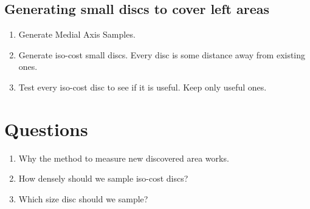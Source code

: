 \documentclass[12pt]{article}
\begin{document}
	
	\subsection{Generating small discs to cover left areas}
	
	\begin{enumerate}
	\item Generate Medial Axis Samples.
	\item Generate iso-cost small discs. Every disc is some distance away from existing ones.
	\item Test every iso-cost disc to see if it is useful. Keep only useful ones.
	\end{enumerate}
	
	\section{Questions}
		
	\begin{enumerate}
	\item Why the method to measure new discovered area works.
	\item How densely should we sample iso-cost discs?
	\item Which size disc should we sample?
	\end{enumerate}
	
  
\end{document}
